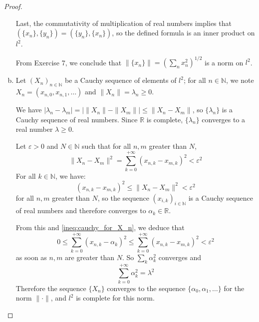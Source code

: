 \documentclass[11pt,a4paper,twoside]{article}
\theoremstyle{definition}
\begin{document}
\begin{proof}
\begin{enumerate}[(a)]
    Last, the commutativity of multiplication of real numbers implies that $(\{ x_n \}, \{ y_n \}) = (\{ y_n \}, \{ x_n \})$,
    so the defined formula is an inner product on $l^2$.

    From Exercise 7, we conclude that $\| \{ x_n \} \| = \left( \sum_n x_n^2 \right)^{1 / 2}$ is a norm on $l^2$.

  \item Let $\left( X_n \right)_{n \in \mathbb{N}}$ be a Cauchy sequence of elements of $l^2$;
    for all $n \in \mathbb{N}$, we note $X_n = (x_{n, 0}, x_{n, 1}, \dotsc)$ and $\| X_n \| = \lambda_n \geq 0$.

    We have $\left| \lambda_n - \lambda_m \right| = \left| \| X_n \| - \| X_m \| \right| \leq \| X_n - X_m \|$,
    so $\{ \lambda_n \}$ is a Cauchy sequence of real numbers. Since $\mathbb{R}$ is complete, $\{ \lambda_n \}$ converges to a real number $\lambda \geq 0$.

    Let $\varepsilon > 0$ and $N \in \mathbb{N}$ such that for all $n, m$ greater than $N$,
    \begin{equation} \label{ineq:cauchy_for_X_n}
      \| X_n - X_m \|^2 = \sum_{k = 0}^{+\infty} \left( x_{n,k} - x_{m, k} \right)^2 < \varepsilon^2
    \end{equation}
    For all $k \in \mathbb{N}$, we have:
    \begin{equation*}
      \left( x_{n, k} - x_{m, k} \right)^2 \leq \| X_n - X_m \|^2 < \varepsilon^2
    \end{equation*}
    for all $n, m$ greater than $N$, so the sequence $\left( x_{i, k} \right)_{i \in \mathbb{N}}$ is a Cauchy sequence of real numbers
    and therefore converges to $\alpha_k \in \mathbb{R}$.

    From this and \eqref{ineq:cauchy_for_X_n}, we deduce that
    \begin{equation*}
      0 \leq \sum_{k = 0}^{+\infty} (x_{n, k} - \alpha_k)^2 \leq \sum_{k = 0}^{+\infty} (x_{n, k} - x_{m, k})^2 < \varepsilon^2
    \end{equation*}
    as soon as $n, m$ are greater than $N$. So $\sum_k \alpha_k^2$ converges and
    \begin{equation*}
      \sum_{k = 0}^{+\infty} \alpha_k^2 = \lambda^2
    \end{equation*}
    Therefore the sequence $\{ X_n \}$ converges to the sequence $\{ \alpha_0, \alpha_1, \dotsc \}$ for the norm $\| \cdot \|$,
    and $l^2$ is complete for this norm.

  \end{enumerate}

\end{proof}
\end{document}
